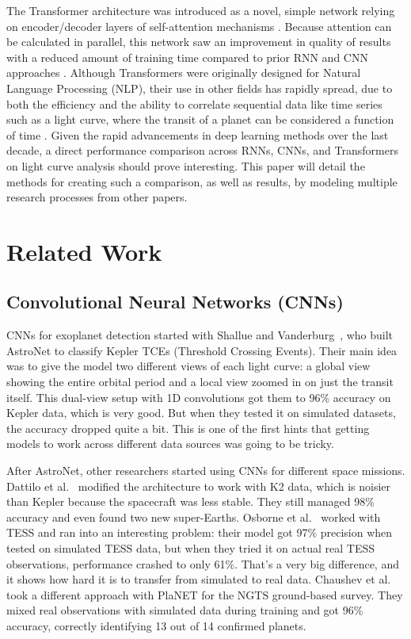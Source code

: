 \documentclass[letterpaper]{article} %
\begin{document}
The Transformer architecture was introduced as a novel, simple network relying on encoder/decoder layers of self-attention mechanisms \cite{vaswani2017attentionneed}. Because attention can be calculated in parallel, this network saw an improvement in quality of results with a reduced amount of training time compared to prior RNN and CNN approaches \cite{vaswani2017attentionneed}. Although Transformers were originally designed for Natural Language Processing (NLP), their use in other fields has rapidly spread, due to both the efficiency and the ability to correlate sequential data like time series such as a light curve, where the transit of a planet can be considered a function of time \cite{salinas2023distinguishingtransitfalsepositives}. Given the rapid advancements in deep learning methods over the last decade, a direct performance comparison across RNNs, CNNs, and Transformers on light curve analysis should prove interesting. This paper will detail the methods for creating such a comparison, as well as results, by modeling multiple research processes from other papers.

\section*{Related Work}
\subsection{Convolutional Neural Networks (CNNs)}
CNNs for exoplanet detection started with Shallue and Vanderburg~\cite{Shallue2018identifyexoplanetsI}, who built AstroNet to classify Kepler TCEs (Threshold Crossing Events). Their main idea was to give the model two different views of each light curve: a global view showing the entire orbital period and a local view zoomed in on just the transit itself. This dual-view setup with 1D convolutions got them to 96\% accuracy on Kepler data, which is very good. But when they tested it on simulated datasets, the accuracy dropped quite a bit. This is one of the first hints that getting models to work across different data sources was going to be tricky.

After AstroNet, other researchers started using CNNs for different space missions. Dattilo et al.~\cite{Dattilo2019identifyexoplanetsII} modified the architecture to work with K2 data, which is noisier than Kepler because the spacecraft was less stable. They still managed 98\% accuracy and even found two new super-Earths. Osborne et al.~\cite{Osborn2019rapidclassificationtesscandidates} worked with TESS and ran into an interesting problem: their model got 97\% precision when tested on simulated TESS data, but when they tried it on actual real TESS observations, performance crashed to only 61\%. That's a very big difference, and it shows how hard it is to transfer from simulated to real data. Chaushev et al.~\cite{Chaushev2019ngts} took a different approach with PlaNET for the NGTS ground-based survey. They mixed real observations with simulated data during training and got 96\% accuracy, correctly identifying 13 out of 14 confirmed planets.
\end{document}
